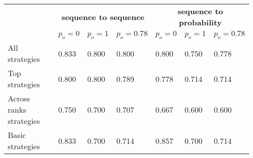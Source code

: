 \begin{tabular}{lllllll}
\toprule
{} & \multicolumn{3}{c}{\textbf{sequence to sequence}} & \multicolumn{3}{c}{\textbf{sequence to probability}} \\
{} &                       $p_o=0$ &                     $p_o=1$ &                    $p_o=0.78$ &                       $p_o=0$ &                       $p_o=1$ &                    $p_o=0.78$ \\
\midrule
All strategies          &  \cellcolor{orange!83.0}0.833   &  \cellcolor{orange!80.0}0.800 &    \cellcolor{orange!80.0}0.800 &    \cellcolor{orange!80.0}0.800 &   \cellcolor{orange!75.0}0.750 &  \cellcolor{orange!78.0}0.778 \\
Top strategies          &    \cellcolor{orange!80.0}0.800 &  \cellcolor{orange!80.0}0.800 &  \cellcolor{orange!79.0}0.789 &  \cellcolor{orange!78.0}0.778 &  \cellcolor{orange!71.0}0.714 &  \cellcolor{orange!71.0}0.714 \\
Across ranks strategies &   \cellcolor{orange!75.0}0.750  &  \cellcolor{orange!70.0}0.700 &  \cellcolor{orange!71.0}0.707 &  \cellcolor{orange!67.0}0.667 &    \cellcolor{orange!60.0}0.600 &    \cellcolor{orange!60.0}0.600 \\
Basic strategies        &  \cellcolor{orange!83.0}0.833   &  \cellcolor{orange!70.0}0.700 &  \cellcolor{orange!71.0}0.714 &  \cellcolor{orange!86.0}0.857 &    \cellcolor{orange!70.0}0.700 &  \cellcolor{orange!71.0}0.714 \\
\bottomrule
\end{tabular}
